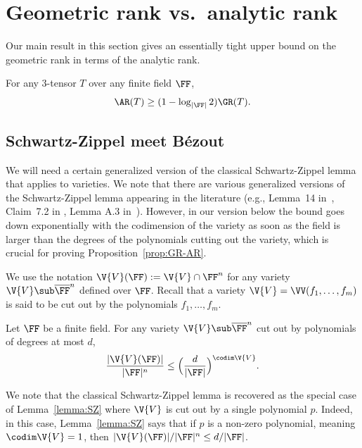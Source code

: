 \section{Geometric rank vs.\ analytic rank}\label{sec:GR-AR}

Our main result in this section gives an essentially tight upper bound on the geometric rank in terms of the analytic rank. 

\begin{proposition}\label{prop:GR-AR}
For any $3$-tensor $T$ over any finite field $\FF$,
$$\AR(T) \ge (1-\log_{|\FF|}2)\GR(T) .$$
\end{proposition}



\subsection{Schwartz-Zippel meet B\'{e}zout}

We will need a certain generalized version of the classical Schwartz-Zippel lemma that applies to varieties.
We note that there are various generalized versions of the Schwartz-Zippel lemma appearing in the literature (e.g., Lemma~14 in~\cite{BukhTs12}, Claim~7.2 in \cite{DvirKoLo14}, Lemma A.3 in~\cite{EllenbergObTa10}).
However, in our version below the bound goes down exponentially with the codimension of the variety as soon as the field is larger than the degrees of the polynomials cutting out the variety, which is crucial for proving Proposition~\ref{prop:GR-AR}.

We use the notation $\V{V}(\FF) := \V{V} \cap \FF^n$ for any variety $\V{V} \sub \overline{\FF}^n$ defined over $\FF$.
Recall that a variety $\V{V} = \VV(f_1,\ldots,f_m)$ is said to be cut out by the polynomials $f_1,\ldots,f_m$.


\begin{lemma}\label{lemma:SZ}
Let $\FF$ be a finite field.
For any variety $\V{V} \sub \overline{\FF}^n$
cut out by polynomials of degrees at most $d$, 
$$\frac{|\V{V}(\FF)|}{|\FF|^n} \le \Big(\frac{d}{|\FF|}\Big)^{\codim\V{V}}.$$
\end{lemma}

We note that the classical Schwartz-Zippel lemma is recovered as the special case of Lemma~\ref{lemma:SZ} where $\V{V}$ is cut out by a single polynomial $p$. Indeed, in this case, Lemma~\ref{lemma:SZ} says that if $p$ is a non-zero polynomial, meaning $\codim\V{V}=1$, then $|\V{V}(\FF)|/|\FF|^n \le d/|\FF|$.

